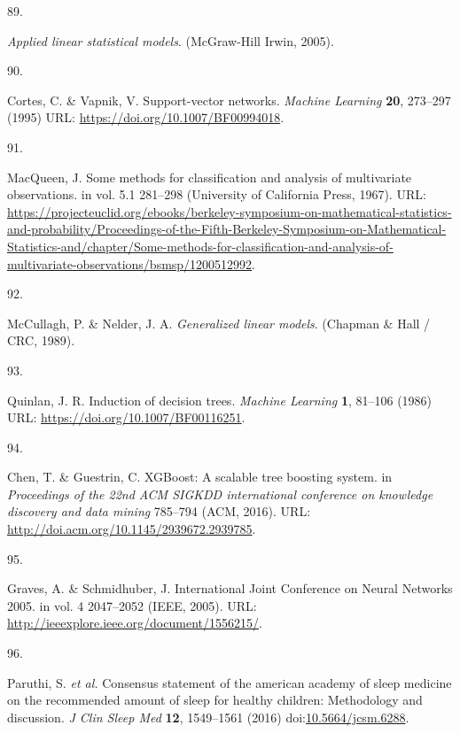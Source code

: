 \documentclass[
  10pt,
]{scrbook}
\newlength{\cslhangindent}
\newlength{\csllabelwidth}
\newlength{\cslentryspacingunit} %
\newenvironment{CSLReferences}[2] %
 {%
  \setlength{\parindent}{0pt}
  \ifodd #1
  \let\oldpar\par
  \def\par{\hangindent=\cslhangindent\oldpar}
  \fi
  \setlength{\parskip}{#2\cslentryspacingunit}
 }%
 {}
\newcommand{\CSLLeftMargin}[1]{\parbox[t]{\csllabelwidth}{#1}}
\newcommand{\CSLRightInline}[1]{\parbox[t]{\linewidth - \csllabelwidth}{#1}\break}
\let\originaltextbf\textbf
\renewcommand{\textbf}[1]{\textcolor{color1}{\textsf{\originaltextbf{#1}}}}
\begin{document}
\begin{CSLReferences}{0}{0}
\leavevmode{}%
\CSLLeftMargin{89. }%
\CSLRightInline{\emph{Applied linear statistical models}. (McGraw-Hill
Irwin, 2005).}

\leavevmode{}%
\CSLLeftMargin{90. }%
\CSLRightInline{Cortes, C. \& Vapnik, V. Support-vector networks.
\emph{Machine Learning} \textbf{20}, 273--297 (1995) URL:
\url{https://doi.org/10.1007/BF00994018}.}

\leavevmode{}%
\CSLLeftMargin{91. }%
\CSLRightInline{MacQueen, J. Some methods for classification and
analysis of multivariate observations. in vol. 5.1 281--298 (University
of California Press, 1967). URL:
\url{https://projecteuclid.org/ebooks/berkeley-symposium-on-mathematical-statistics-and-probability/Proceedings-of-the-Fifth-Berkeley-Symposium-on-Mathematical-Statistics-and/chapter/Some-methods-for-classification-and-analysis-of-multivariate-observations/bsmsp/1200512992}.}

\leavevmode{}%
\CSLLeftMargin{92. }%
\CSLRightInline{McCullagh, P. \& Nelder, J. A. \emph{Generalized linear
models}. (Chapman \& Hall / CRC, 1989).}

\leavevmode{}%
\CSLLeftMargin{93. }%
\CSLRightInline{Quinlan, J. R. Induction of decision trees.
\emph{Machine Learning} \textbf{1}, 81--106 (1986) URL:
\url{https://doi.org/10.1007/BF00116251}.}

\leavevmode{}%
\CSLLeftMargin{94. }%
\CSLRightInline{Chen, T. \& Guestrin, C. {XGBoost}: A scalable tree
boosting system. in \emph{Proceedings of the 22nd ACM SIGKDD
international conference on knowledge discovery and data mining}
785--794 (ACM, 2016). URL:
\url{http://doi.acm.org/10.1145/2939672.2939785}.}

\leavevmode{}%
\CSLLeftMargin{95. }%
\CSLRightInline{Graves, A. \& Schmidhuber, J. International Joint
Conference on Neural Networks 2005. in vol. 4 2047--2052 (IEEE, 2005).
URL: \url{http://ieeexplore.ieee.org/document/1556215/}.}

\leavevmode{}%
\CSLLeftMargin{96. }%
\CSLRightInline{Paruthi, S. \emph{et al.} Consensus statement of the
american academy of sleep medicine on the recommended amount of sleep
for healthy children: Methodology and discussion. \emph{J Clin Sleep
Med} \textbf{12}, 1549--1561 (2016)
doi:\href{https://doi.org/10.5664/jcsm.6288}{10.5664/jcsm.6288}.}


\end{CSLReferences}
\end{document}
